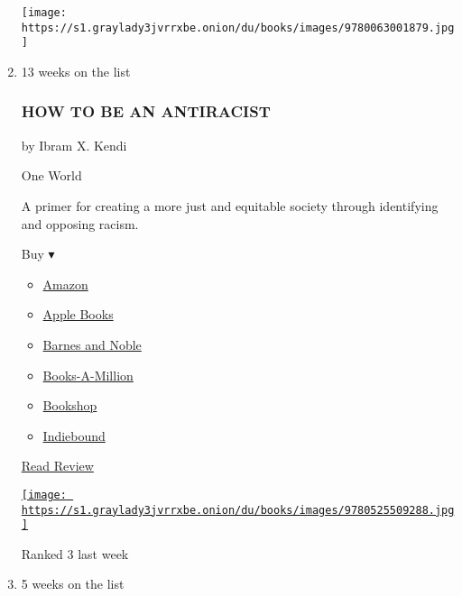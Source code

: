 \begin{enumerate}
  \texttt{[image: https://s1.graylady3jvrrxbe.onion/du/books/images/9780063001879.jpg]}
\item
  \href{https://www.nytimes3xbfgragh.onion/2019/08/20/books/review/how-to-be-an-antiracist-ibram-x-kendi.html}{}

  13 weeks on the list

  \hypertarget{how-to-be-an-antiracist}{%
  \subsubsection{HOW TO BE AN
  ANTIRACIST}\label{how-to-be-an-antiracist}}

  by Ibram X. Kendi

  One World

  A primer for creating a more just and equitable society through
  identifying and opposing racism.

  Buy ▾

  \begin{itemize}
  \tightlist
  \item
    \href{https://www.amazon.com/How-Be-Antiracist-Ibram-Kendi/dp/0525509283?tag=NYTBS-20}{Amazon}
  \item
    \href{https://du-gae-books-dot-nyt-du-prd.appspot.com/buy?title=HOW+TO+BE+AN+ANTIRACIST\&author=Ibram+X+Kendi}{Apple
    Books}
  \item
    \href{https://www.anrdoezrs.net/click-7990613-11819508?url=https\%3A\%2F\%2Fwww.barnesandnoble.com\%2Fw\%2F\%3Fean\%3D9780525509288}{Barnes
    and Noble}
  \item
    \href{https://www.anrdoezrs.net/click-7990613-35140?url=https\%3A\%2F\%2Fwww.booksamillion.com\%2Fp\%2FHOW\%2BTO\%2BBE\%2BAN\%2BANTIRACIST\%2FIbram\%2BX\%2BKendi\%2F9780525509288}{Books-A-Million}
  \item
    \href{https://bookshop.org/a/3546/9780525509288}{Bookshop}
  \item
    \href{https://www.indiebound.org/book/9780525509288?aff=NYT}{Indiebound}
  \end{itemize}

  \href{https://www.nytimes3xbfgragh.onion/2019/08/20/books/review/how-to-be-an-antiracist-ibram-x-kendi.html}{Read
  Review}

  \href{https://www.nytimes3xbfgragh.onion/2019/08/20/books/review/how-to-be-an-antiracist-ibram-x-kendi.html}{\texttt{[image: https://s1.graylady3jvrrxbe.onion/du/books/images/9780525509288.jpg]}}

  Ranked 3 last week
\item
  5 weeks on the list


\end{enumerate}

